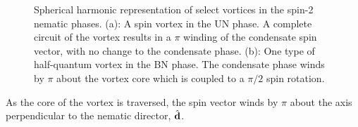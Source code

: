 \begin{figure}
    \centering
    \caption[Spherical harmonic representation of spin-2 vortices]
    {\label{fig: SV-HQV}Spherical harmonic representation of select vortices in the spin-2
        nematic phases.
        (a): A spin vortex in the UN phase. A complete circuit of the vortex
        results in a \(\pi \) winding of the condensate spin vector, with no
        change to the condensate phase.
        (b): One type of half-quantum vortex in the BN phase.
        The condensate phase winds by \(\pi \) about the vortex core which is
        coupled to a \(\pi / 2\) spin rotation.}
\end{figure}
As the core of the vortex is traversed, the spin vector winds by \(\pi \) about
the axis perpendicular to the nematic director, \(\hat{\vb{d}}\).

